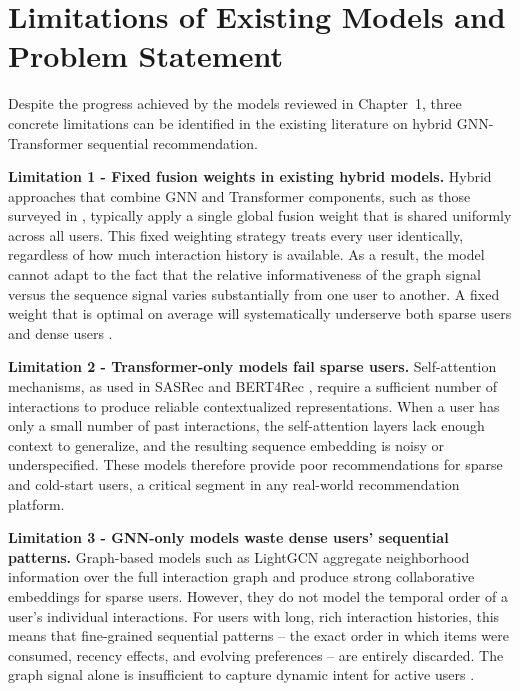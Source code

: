 \documentclass[12pt,a4paper]{report}
\begin{document}
\section{Limitations of Existing Models and Problem Statement}
\label{sec:limitations}

\justifying
Despite the progress achieved by the models reviewed in Chapter~1, three
concrete limitations can be identified in the existing literature on hybrid
GNN-Transformer sequential recommendation.

\textbf{Limitation 1 - Fixed fusion weights in existing hybrid models.}
Hybrid approaches that combine GNN and Transformer components, such as those
surveyed in \citep{wu2020gnnsurvey}, typically apply a single global fusion
weight that is shared uniformly across all users. This fixed weighting strategy
treats every user identically, regardless of how much interaction history is
available. As a result, the model cannot adapt to the fact that the relative
informativeness of the graph signal versus the sequence signal varies
substantially from one user to another. A fixed weight that is optimal on
average will systematically underserve both sparse users and dense users
\citep{pan2024survey}.

\textbf{Limitation 2 - Transformer-only models fail sparse users.}
Self-attention mechanisms, as used in SASRec \citep{kang2018sasrec} and
BERT4Rec \citep{sun2019bert4rec}, require a sufficient number of interactions
to produce reliable contextualized representations. When a user has only a
small number of past interactions, the self-attention layers lack enough context
to generalize, and the resulting sequence embedding is noisy or
underspecified. These models therefore provide poor recommendations for sparse
and cold-start users, a critical segment in any real-world recommendation
platform.

\textbf{Limitation 3 - GNN-only models waste dense users' sequential patterns.}
Graph-based models such as LightGCN \citep{he2020lightgcn} aggregate
neighborhood information over the full interaction graph and produce strong
collaborative embeddings for sparse users. However, they do not model the
temporal order of a user's individual interactions. For users with long, rich
interaction histories, this means that fine-grained sequential patterns --
the exact order in which items were consumed, recency effects, and evolving
preferences -- are entirely discarded. The graph signal alone is insufficient
to capture dynamic intent for active users \citep{pan2024survey}.
\end{document}

